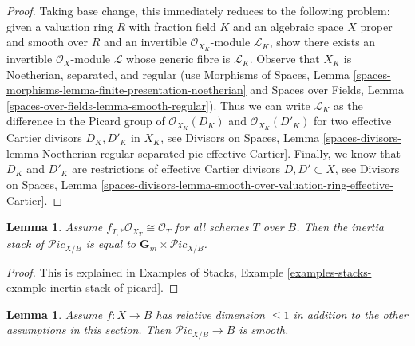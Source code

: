 \documentclass{stacks-project}
\theoremstyle{plain}
\newtheorem{lemma}[subsection]{Lemma}
\theoremstyle{definition}
\theoremstyle{remark}
\numberwithin{equation}{subsection}
\def\Picardstack{\mathcal{P}\!\mathit{ic}}
\begin{document}
\begin{proof}
Taking base change, this immediately reduces to the following
problem: given a valuation ring $R$ with fraction field $K$ and
an algebraic space $X$ proper and smooth over $R$ and an invertible
$\mathcal{O}_{X_K}$-module $\mathcal{L}_K$, show there exists
an invertible $\mathcal{O}_X$-module $\mathcal{L}$
whose generic fibre is $\mathcal{L}_K$.
Observe that $X_K$ is Noetherian, separated, and regular
(use Morphisms of Spaces, Lemma
\ref{spaces-morphisms-lemma-finite-presentation-noetherian}
and
Spaces over Fields, Lemma \ref{spaces-over-fields-lemma-smooth-regular}).
Thus we can write
$\mathcal{L}_K$ as the difference in the Picard group of
$\mathcal{O}_{X_K}(D_K)$ and $\mathcal{O}_{X_K}(D'_K)$
for two effective Cartier divisors $D_K, D'_K$ in $X_K$, see
Divisors on Spaces, Lemma
\ref{spaces-divisors-lemma-Noetherian-regular-separated-pic-effective-Cartier}.
Finally, we know that $D_K$ and $D'_K$ are restrictions of
effective Cartier divisors $D, D' \subset X$, see
Divisors on Spaces, Lemma
\ref{spaces-divisors-lemma-smooth-over-valuation-ring-effective-Cartier}.
\end{proof}

\begin{lemma}
\label{lemma-pic-inertia}
Assume $f_{T, *}\mathcal{O}_{X_T} \cong \mathcal{O}_T$ for all
schemes $T$ over $B$. Then the inertia stack of $\Picardstack_{X/B}$
is equal to $\mathbf{G}_m \times \Picardstack_{X/B}$.
\end{lemma}

\begin{proof}
This is explained in Examples of Stacks, Example
\ref{examples-stacks-example-inertia-stack-of-picard}.
\end{proof}

\begin{lemma}
\label{lemma-pic-curves-smooth}
Assume $f : X \to B$ has relative dimension $\leq 1$ in addition to
the other assumptions in this section. Then $\Picardstack_{X/B} \to B$
is smooth.
\end{lemma}
\end{document}
